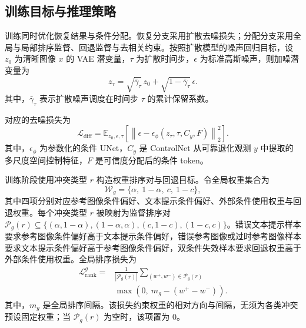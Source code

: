 \documentclass[journal]{IEEEtran}
\begin{document}
\subsection{训练目标与推理策略}
训练同时优化恢复结果与条件分配。恢复分支采用扩散去噪损失；分配分支采用全局与局部排序监督、回退监督与去相关约束。按照扩散模型的噪声回归目标\cite{ho2020ddpm,rombach2022ldm,podell2023sdxl}，设 $z_0$ 为清晰图像 $x$ 的 VAE 潜变量，$\tau$ 为扩散时间步，$\epsilon$ 为标准高斯噪声，则加噪潜变量为
\begin{equation}
\label{eq:noisy_latent}
z_{\tau}
=
\sqrt{\bar{\gamma}_{\tau}}\,z_0
+
\sqrt{1-\bar{\gamma}_{\tau}}\,\epsilon.
\end{equation}
其中，$\bar{\gamma}_{\tau}$ 表示扩散噪声调度在时间步 $\tau$ 的累计保留系数。

对应的去噪损失为
\begin{equation}
\label{eq:diffusion_loss}
\mathcal{L}_{\mathrm{diff}}
=
\mathbb{E}_{z_0,\epsilon,\tau}
\left[
\left\|
\epsilon-\epsilon_{\phi}(z_{\tau},\tau,C_y,F)
\right\|_2^2
\right].
\end{equation}
其中，$\epsilon_\phi$ 为参数化的条件 UNet，$C_y$ 是 ControlNet 从可靠退化观测 $y$ 中提取的多尺度空间控制特征，$F$ 是可信度分配后的条件 token。

训练阶段使用冲突类型 $r$ 构造权重排序对与回退目标。令全局权重集合为
\begin{equation}
\label{eq:global_weight_set}
\mathcal{W}_g=\{\alpha,\ 1-\alpha,\ c,\ 1-c\},
\end{equation}
其中四项分别对应参考图像条件偏好、文本提示条件偏好、外部条件使用权重与回退权重。每个冲突类型 $r$ 被映射为监督排序对 $\mathcal{P}_g(r)\subseteq\{(\alpha,1-\alpha),(1-\alpha,\alpha),(c,1-c),(1-c,c)\}$。错误文本提示样本要求参考图像条件偏好高于文本提示条件偏好，错误参考图像或过时参考图像样本要求文本提示条件偏好高于参考图像条件偏好，双条件失效样本要求回退权重高于外部条件使用权重。全局排序损失为
\begin{equation}
\label{eq:global_rank_loss}
\begin{aligned}
\mathcal{L}^{g}_{\mathrm{rank}}
=&
\frac{1}{|\mathcal{P}_g(r)|}
\sum_{(w^+,w^-)\in\mathcal{P}_g(r)}
\\[-1pt]
&\max\!\left(0,\ m_g-(w^+-w^-)\right).
\end{aligned}
\end{equation}
其中，$m_g$ 是全局排序间隔。该损失约束权重的相对方向与间隔，无须为各类冲突预设固定权重；当 $\mathcal{P}_g(r)$ 为空时，该项置为 $0$。
\end{document}
